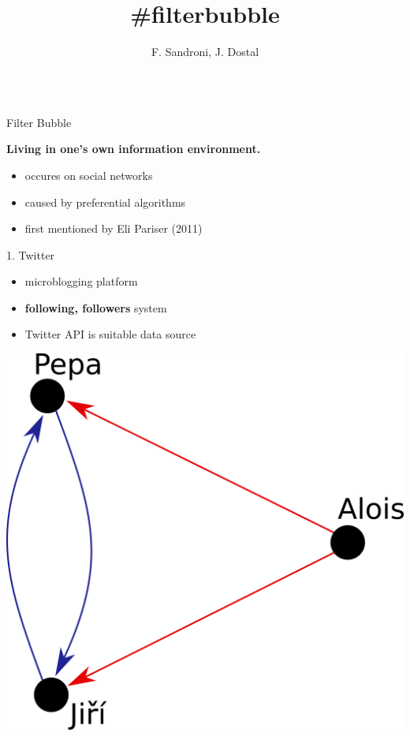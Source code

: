 \documentclass{beamer}
\title{\#filterbubble}
\author[dostal.jakub@outlook.com]{F. Sandroni, J. Dostal}
\begin{document}
\begin{frame}[fragile]
\begin{columns}[T]
\begin{column}{.33\textwidth}

\begin{block}{Filter Bubble}
    \center
    \begin{large}\textbf{Living in one's own information environment.}\end{large}
    \vspace{0.8cm}
    \begin{itemize}
        \item occures on social networks
        \item caused by preferential algorithms
        \item first mentioned by Eli Pariser (2011)
    \end{itemize}
\end{block}
\begin{blankblock}{1. Twitter}
	\begin{itemize}
		\item microblogging platform
        \item \textbf{following, followers} system
		\item Twitter API is suitable data source
	\end{itemize}
	\center
	\includegraphics[scale=0.55]{./Pics/pepa.png}

\end{blankblock}
\end{column}
\end{columns}
\end{frame}
\end{document}
